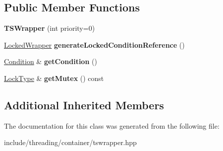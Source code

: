 \subsection*{Public Member Functions}
\begin{DoxyCompactItemize}
\item 
\hypertarget{classcore_1_1threading_1_1container_1_1_t_s_wrapper_ac2b5a5e50702dd004dff2bf66d2c40de}{{\bfseries T\-S\-Wrapper} (int priority=0)}\label{classcore_1_1threading_1_1container_1_1_t_s_wrapper_ac2b5a5e50702dd004dff2bf66d2c40de}

\item 
\hypertarget{classcore_1_1threading_1_1container_1_1_t_s_wrapper_a3551ee3ae48dc3e2385c2101a1ad1343}{\hyperlink{classcore_1_1threading_1_1_locked_condition_reference_ptr}{Locked\-Wrapper} {\bfseries generate\-Locked\-Condition\-Reference} ()}\label{classcore_1_1threading_1_1container_1_1_t_s_wrapper_a3551ee3ae48dc3e2385c2101a1ad1343}

\item 
\hypertarget{classcore_1_1threading_1_1container_1_1_t_s_wrapper_aea2bb1b94534f6b2acff1c1562da2863}{\hyperlink{classcore_1_1threading_1_1_condition_lock}{Condition} \& {\bfseries get\-Condition} ()}\label{classcore_1_1threading_1_1container_1_1_t_s_wrapper_aea2bb1b94534f6b2acff1c1562da2863}

\item 
\hypertarget{classcore_1_1threading_1_1container_1_1_t_s_wrapper_a716a63cd0216c167db4aea83311cf6fa}{\hyperlink{classcore_1_1threading_1_1_condition_lock}{Lock\-Type} \& {\bfseries get\-Mutex} () const }\label{classcore_1_1threading_1_1container_1_1_t_s_wrapper_a716a63cd0216c167db4aea83311cf6fa}

\end{DoxyCompactItemize}
\subsection*{Additional Inherited Members}


The documentation for this class was generated from the following file\-:\begin{DoxyCompactItemize}
\item 
include/threading/container/tswrapper.\-hpp\end{DoxyCompactItemize}
